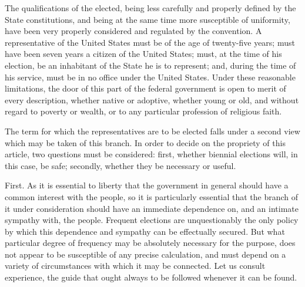 The qualifications of the elected, being less carefully and properly defined by the State constitutions, and being at the same time more susceptible of uniformity, have been very properly considered and regulated by the convention. 
A representative of the United States must be of the age of twenty-five years; must have been seven years a citizen of the United States; must, at the time of his election, be an inhabitant of the State he is to represent; and, during the time of his service, must be in no office under the United States. 
Under these reasonable limitations, the door of this part of the federal government is open to merit of every description, whether native or adoptive, whether young or old, and without regard to poverty or wealth, or to any particular profession of religious faith.

The term for which the representatives are to be elected falls under a second view which may be taken of this branch. 
In order to decide on the propriety of this article, two questions must be considered: first, whether biennial elections will, in this case, be safe; secondly, whether they be necessary or useful.

First. 
As it is essential to liberty that the government in general should have a common interest with the people, so it is particularly essential that the branch of it under consideration should have an immediate dependence on, and an intimate sympathy with, the people. 
Frequent elections are unquestionably the only policy by which this dependence and sympathy can be effectually secured. 
But what particular degree of frequency may be absolutely necessary for the purpose, does not appear to be susceptible of any precise calculation, and must depend on a variety of circumstances with which it may be connected. 
Let us consult experience, the guide that ought always to be followed whenever it can be found.

